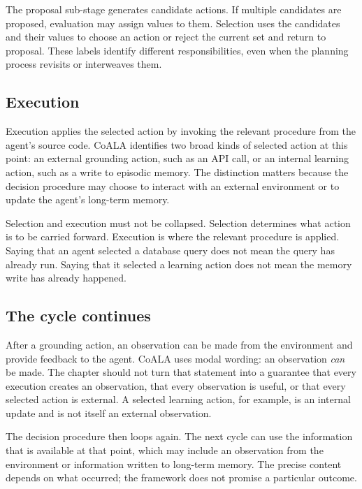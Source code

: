 The proposal sub-stage generates candidate actions. If multiple candidates are proposed, evaluation may assign values to them. Selection uses the candidates and their values to choose an action or reject the current set and return to proposal. These labels identify different responsibilities, even when the planning process revisits or interweaves them.

\subsection{Execution}

Execution applies the selected action by invoking the relevant procedure from the agent's source code. CoALA identifies two broad kinds of selected action at this point: an external grounding action, such as an API call, or an internal learning action, such as a write to episodic memory. The distinction matters because the decision procedure may choose to interact with an external environment or to update the agent's long-term memory.

Selection and execution must not be collapsed. Selection determines what action is to be carried forward. Execution is where the relevant procedure is applied. Saying that an agent selected a database query does not mean the query has already run. Saying that it selected a learning action does not mean the memory write has already happened.

\subsection{The cycle continues}

After a grounding action, an observation can be made from the environment and provide feedback to the agent. CoALA uses modal wording: an observation \emph{can} be made. The chapter should not turn that statement into a guarantee that every execution creates an observation, that every observation is useful, or that every selected action is external. A selected learning action, for example, is an internal update and is not itself an external observation.

The decision procedure then loops again. The next cycle can use the information that is available at that point, which may include an observation from the environment or information written to long-term memory. The precise content depends on what occurred; the framework does not promise a particular outcome.


